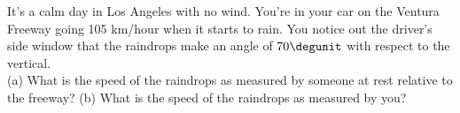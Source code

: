 It's a calm day in Los Angeles with no wind.
You're in your car on the Ventura Freeway going 105 km/hour
when it starts to rain.
You notice out the driver's side window that
the raindrops make an angle of $70\degunit$ with respect to the
vertical.\\
%
(a) What is the speed of the raindrops as measured by someone 
at rest relative to the freeway?\answercheck\hwendpart
%
(b) What is the speed of the raindrops as measured by you?\answercheck
